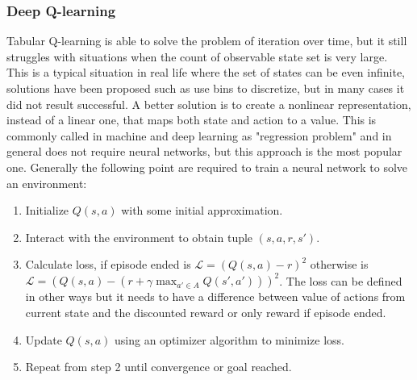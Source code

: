 \subsubsection{Deep Q-learning}
Tabular Q-learning is able to solve the problem of iteration over time, but it still struggles with situations when the count of observable state set is very large. This is a typical situation in real life where the set of states can be even infinite, solutions have been proposed such as use bins to discretize, but in many cases it did not result successful.
A better solution is to create a nonlinear representation, instead of a linear one, that maps both state and action to a value. This is commonly called in machine and deep learning as "regression problem" and in general does not require neural networks, but this approach is the most popular one.
Generally the following point are required to train a neural network to solve an environment:
\begin{enumerate}
	\item Initialize $Q(s,a)$ with some initial approximation.
	\item Interact with the environment to obtain tuple $(s,a,r,s')$.
	\item Calculate loss, if episode ended is $\mathcal{L} = (Q(s,a) - r)^2$ otherwise is $\mathcal{L} = (Q(s,a) - (r + \gamma \max_{a' \in A} Q(s',a')))^2$. The loss can be defined in other ways but it needs to have a difference between value of actions from current state and the discounted reward or only reward if episode ended.
	\item Update $Q(s,a)$ using an optimizer algorithm to minimize loss.
	\item Repeat from step 2 until convergence or goal reached.
\end{enumerate}

